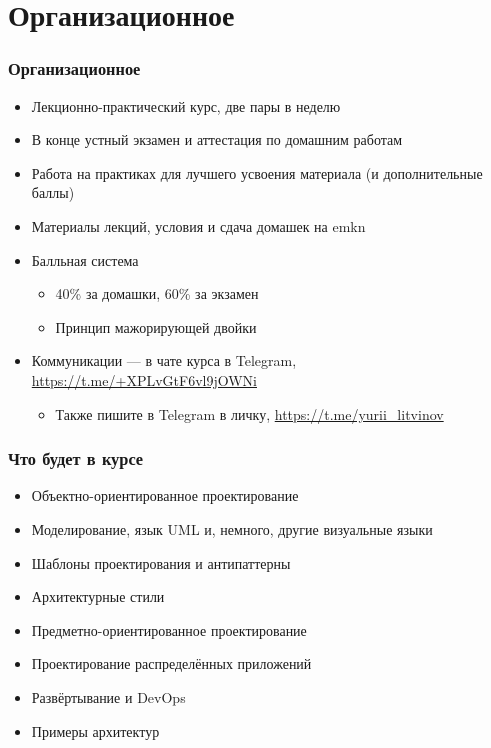 \documentclass{../../slides-style}
\begin{document}
    \begin{frame}[plain]
        \titlepage
    \end{frame}

    \section{Организационное}

    \begin{frame}
        \frametitle{Организационное}
        \begin{itemize}
            \item Лекционно-практический курс, две пары в неделю
            \item В конце устный экзамен и аттестация по домашним работам
            \item Работа на практиках для лучшего усвоения материала (и дополнительные баллы)
            \item Материалы лекций, условия и сдача домашек на emkn
            \item Балльная система
            \begin{itemize}
                \item 40\% за домашки, 60\% за экзамен
                \item Принцип мажорирующей двойки
            \end{itemize}
            \item Коммуникации --- в чате курса в Telegram, \url{https://t.me/+XPLvGtF6vl9jOWNi}
            \begin{itemize}
                \item Также пишите в Telegram в личку, \url{https://t.me/yurii_litvinov}
            \end{itemize}
        \end{itemize}
    \end{frame}

    \begin{frame}
        \frametitle{Что будет в курсе}
        \begin{itemize}
            \item Объектно-ориентированное проектирование
            \item Моделирование, язык UML и, немного, другие визуальные языки
            \item Шаблоны проектирования и антипаттерны
            \item Архитектурные стили
            \item Предметно-ориентированное проектирование
            \item Проектирование распределённых приложений
            \item Развёртывание и DevOps
            \item Примеры архитектур
        \end{itemize}
    \end{frame}
\end{document}
